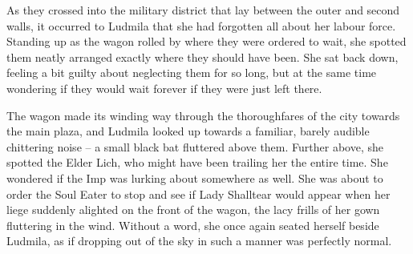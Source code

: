  

As they crossed into the military district that lay between the outer and second walls, it occurred to Ludmila that she had forgotten all about her labour force. Standing up as the wagon rolled by where they were ordered to wait, she spotted them neatly arranged exactly where they should have been. She sat back down, feeling a bit guilty about neglecting them for so long, but at the same time wondering if they would wait forever if they were just left there.

 

The wagon made its winding way through the thoroughfares of the city towards the main plaza, and Ludmila looked up towards a familiar, barely audible chittering noise – a small black bat fluttered above them. Further above, she spotted the Elder Lich, who might have been trailing her the entire time. She wondered if the Imp was lurking about somewhere as well. She was about to order the Soul Eater to stop and see if Lady Shalltear would appear when her liege suddenly alighted on the front of the wagon, the lacy frills of her gown fluttering in the wind. Without a word, she once again seated herself beside Ludmila, as if dropping out of the sky in such a manner was perfectly normal.